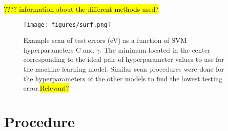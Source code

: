 \documentclass[10pt]{article}
\begin{document}
\hl{???? information about the different methods used?}



 \begin{figure}[H]
   \begin{center}
     \texttt{[image: figures/surf.png]}
   \end{center}
   \caption{Example scan of test errors (eV) as a function of SVM hyperparameters C and $\gamma$. The minimum located in the center corresponding to the ideal pair of hyperparameter values to use for the machine learning model. Similar scan procedures were done for the hyperparameters of the other models to find the lowest testing error.\hl{Relevant?}}
   \label{fig:scan}
 \end{figure}

\section{Procedure}
\end{document}
